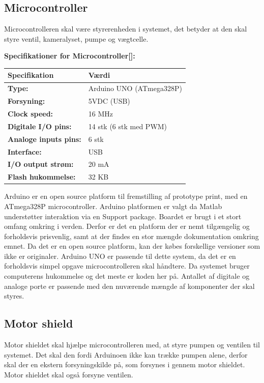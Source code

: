  
\newpage
\subsection{Microcontroller}
Microcontrolleren skal være styrerenheden i systemet, det betyder at den skal styre ventil, kameralyset, pumpe og vægtcelle.  

\textbf{Specifikationer for Microcontroller[\citet{DH3}]:} 
\begin{center}
		\begin{longtable}{ | m{6.5cm} | m{6.5cm}| } 
			\hline
			\textbf{Specifikation} &\textbf{Værdi} \\ 
			\hline
			\textbf{Type:} & Arduino UNO (ATmega328P) \\ 
			\hline
			\textbf{Forsyning:} & 5VDC (USB)  \\ 
			\hline
			\textbf{Clock speed:} & 16 MHz  \\ 
			\hline		
			\textbf{Digitale I/O pins:} & 14 stk (6 stk med PWM)  \\ 
			\hline	
			\textbf{Analoge inputs pins:} & 6 stk  \\ 
			\hline	
			\textbf{Interface:} & USB  \\ 
			\hline	
			\textbf{I/O output strøm:} & 20 mA  \\ 
			\hline
			\textbf{Flash hukommelse:} & 32 KB  \\ 
			\hline	
		\end{longtable}
\end{center}
Arduino er en open source platform til fremstilling af prototype print, med en ATmega328P microcontroller. Arduino platformen er valgt da Matlab understøtter interaktion via en Support package. Boardet er brugt i et stort omfang omkring i verden. Derfor er det en platform der er nemt tilgængelig og forholdsvis prisvenlig, samt at der findes en stor mængde dokumentation omkring emnet. Da det er en open source platform, kan der købes forskellige versioner som ikke er originaler. Arduino UNO er passende til dette system, da det er en forholdsvis simpel opgave microcontrolleren skal håndtere. Da systemet bruger computerens hukommelse og det meste er koden her på. Antallet af digitale og analoge porte er passende med den nuværende mængde af komponenter der skal styres. 

\subsection{Motor shield}
Motor shieldet skal hjælpe microcontrolleren med, at styre pumpen og ventilen til systemet. Det skal den fordi Arduinoen ikke kan trække pumpen alene, derfor skal der en ekstern forsyningskilde på, som forsynes i gennem motor shieldet. Motor shieldet skal også forsyne ventilen. 

